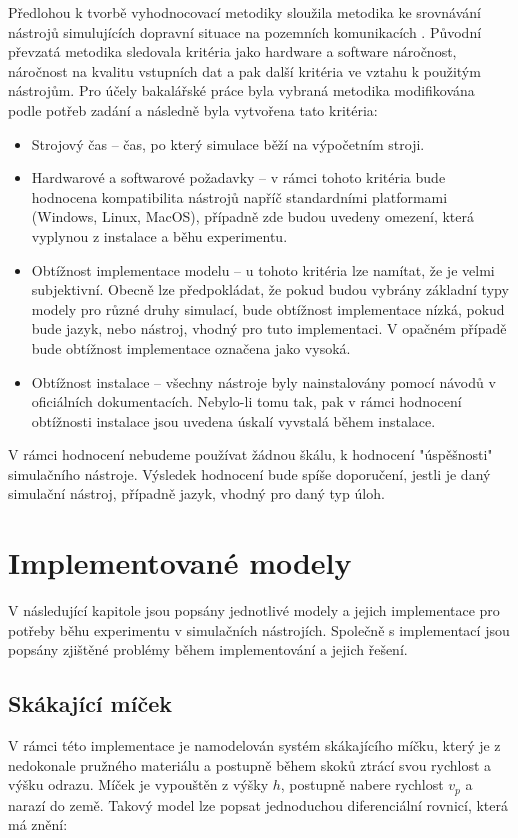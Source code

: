 Předlohou k tvorbě vyhodnocovací metodiky sloužila metodika ke srovnávání nástrojů simulujících dopravní situace na pozemních komunikacích \cite{jones2004traffic}. Původní převzatá metodika sledovala kritéria jako hardware a software náročnost, náročnost na kvalitu vstupních dat a pak další kritéria ve vztahu k použitým nástrojům. Pro účely bakalářské práce byla vybraná metodika modifikována podle potřeb zadání a následně byla vytvořena tato kritéria:
\begin{itemize}
    \item Strojový čas -- čas, po který simulace běží na výpočetním stroji.
    \item Hardwarové a softwarové požadavky -- v rámci tohoto kritéria bude hodnocena kompatibilita nástrojů napříč standardními platformami (Windows, Linux, MacOS), případně zde budou uvedeny omezení, která vyplynou z instalace a běhu experimentu.
    \item Obtížnost implementace modelu -- u tohoto kritéria lze namítat, že je velmi subjektivní. Obecně lze předpokládat, že pokud budou vybrány základní typy modely pro různé druhy simulací, bude obtížnost implementace nízká, pokud bude jazyk, nebo nástroj, vhodný pro tuto implementaci. V opačném případě bude obtížnost implementace označena jako vysoká.
    \item Obtížnost instalace -- všechny nástroje byly nainstalovány pomocí návodů v oficiálních dokumentacích. Nebylo-li tomu tak, pak v rámci hodnocení obtížnosti instalace jsou uvedena úskalí vyvstalá během instalace.
\end{itemize}

V rámci hodnocení nebudeme používat žádnou škálu, k hodnocení "úspěšnosti" simulačního nástroje. Výsledek hodnocení bude spíše doporučení, jestli je daný simulační nástroj, případně jazyk, vhodný pro daný typ úloh.


\section{Implementované modely}
\label{implementace}
V následující kapitole jsou popsány jednotlivé modely a jejich implementace pro potřeby běhu experimentu v simulačních nástrojích. Společně s implementací jsou popsány zjištěné problémy během implementování a jejich řešení. 

\subsection{Skákající míček}
V rámci této implementace je namodelován systém skákajícího míčku, který je z nedokonale pružného materiálu a postupně během skoků ztrácí svou rychlost a výšku odrazu. Míček je vypouštěn z výšky $h$, postupně nabere rychlost $v_p$ a narazí do země. Takový model lze popsat jednoduchou diferenciální rovnicí, která má znění:

